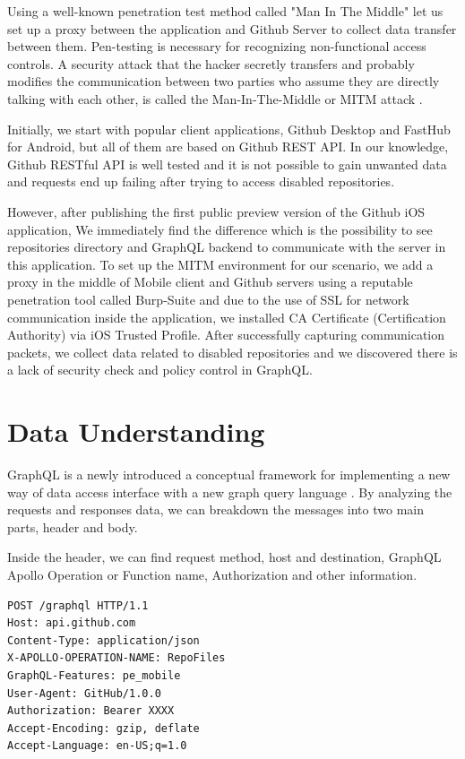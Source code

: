 \documentclass[conference]{IEEEtran}
\begin{document}
Using a well-known penetration test\cite{arkin2005software} method called "Man In The Middle" let us set up a proxy between the application and Github Server to collect data transfer between them. Pen-testing is necessary for recognizing non-functional access controls.
A security attack that the hacker secretly transfers and probably modifies the communication between two parties who assume they are directly talking with each other,  is called the Man-In-The-Middle or MITM attack \cite{callegati2009man}.

Initially, we start with popular client applications, Github Desktop and FastHub for Android, but all of them are based on Github REST API. In our knowledge, Github RESTful API is well tested and it is not possible to gain unwanted data and requests end up failing after trying to access disabled repositories.

However, after publishing the first public preview version of the Github iOS application, We immediately find the difference which is the possibility to see repositories directory and GraphQL backend to communicate with the server in this application.
To set up the MITM environment for our scenario, we add a proxy in the middle of Mobile client and Github servers using a reputable penetration tool called Burp-Suite\cite{rahalkar2016hacking} and due to the use of SSL for network communication inside the application, we installed CA Certificate (Certification Authority) via iOS Trusted Profile. After successfully capturing communication packets, we collect data related to disabled repositories and we discovered there is a lack of security check and policy control in GraphQL.


\section{Data Understanding}

GraphQL is a newly introduced a conceptual framework for implementing a new way of data access interface with a new graph query language \cite{hartig2018semantics}. By analyzing the requests and responses data, we can breakdown the messages into two main parts, header and body.

Inside the header, we can find request method, host and destination, GraphQL Apollo Operation or Function name, Authorization and other information.

\begin{verbatim}
POST /graphql HTTP/1.1
Host: api.github.com
Content-Type: application/json
X-APOLLO-OPERATION-NAME: RepoFiles
GraphQL-Features: pe_mobile
User-Agent: GitHub/1.0.0
Authorization: Bearer XXXX
Accept-Encoding: gzip, deflate
Accept-Language: en-US;q=1.0
\end{verbatim}
\end{document}
